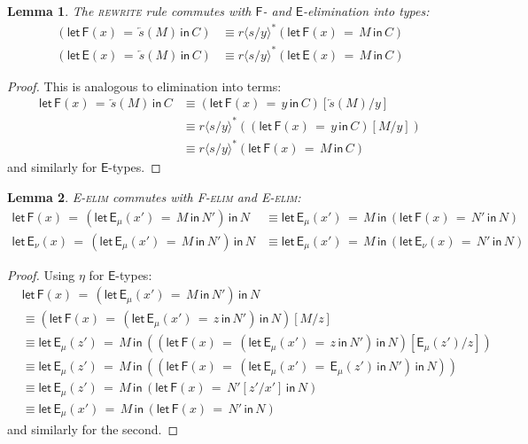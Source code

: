 \documentclass[10pt]{article}
\newtheorem{lemma}{Lemma}
\theoremstyle{definition}
\newcommand{\rewrite}[2]{\overleftarrow{#1}(#2)}
\newcommand\Fsym{\ensuremath{\mathsf{F}}}
\newcommand\Esym{\ensuremath{\mathsf{E}}}
\newcommand\St[2]{\ensuremath{{#1}^*(#2)}}
\newcommand\FE[3]{\ensuremath{\mathsf{let} \, \mathsf{F}(#2) \, = \, {#1} \, \mathsf{in} \, #3}}
\newcommand\EE[3]{\ensuremath{\mathsf{let} \, \mathsf{E}(#2) \, = \, {#1} \, \mathsf{in} \, #3}}
\newcommand\EEs[4]{\ensuremath{\mathsf{let} \, \mathsf{E}_{#1}(#3) \, = \, {#2} \, \mathsf{in} \, #4}}
\newcommand\EIs[2]{\ensuremath{\mathsf{E}_{#1}{(#2)}}}
\newcommand\ap[2]{\ensuremath{#1 \langle #2 \rangle }}
\begin{document}
\begin{lemma}
The \textsc{rewrite} rule commutes with \Fsym- and \Esym-elimination into types:
\begin{align*}
(\FE{\rewrite{s}{M}}{x}{C}) &\equiv \St{\ap{r}{s/y}}{\FE{M}{x}{C}} \\
(\EE{\rewrite{s}{M}}{x}{C}) &\equiv \St{\ap{r}{s/y}}{\EE{M}{x}{C}}
\end{align*}
\end{lemma}
\begin{proof}
This is analogous to elimination into terms:
\begin{align*}
\FE{\rewrite{s}{M}}{x}{C}
&\equiv (\FE{y}{x}{C})[\rewrite{s}{M}/y] \\
&\equiv \St{\ap{r}{s/y}}{(\FE{y}{x}{C})[M/y]} \\
&\equiv \St{\ap{r}{s/y}}{\FE{M}{x}{C}}
\end{align*}
and similarly for \Esym-types.
\end{proof}

\begin{lemma}\label{lem:s-elim-s-elim}
\textsc{E-elim} commutes with \textsc{F-elim} and \textsc{E-elim}:
\begin{align*}
\FE{(\EEs{\mu}{M}{x'}{N'})}{x}{N} &\equiv \EEs{\mu}{M}{x'}{(\FE{N'}{x}{N})} \\
\EEs{\nu}{(\EEs{\mu}{M}{x'}{N'})}{x}{N} &\equiv \EEs{\mu}{M}{x'}{(\EEs{\nu}{N'}{x}{N})}
\end{align*}
\end{lemma}
\begin{proof}
Using $\eta$ for \Esym-types:
\begin{align*}
&\FE{(\EEs{\mu}{M}{x'}{N'})}{x}{N} \\
&\equiv (\FE{(\EEs{\mu}{z}{x'}{N'})}{x}{N})[M/z] \\
&\equiv \EEs{\mu}{M}{z'}{((\FE{(\EEs{\mu}{z}{x'}{N'})}{x}{N})[\EIs{\mu}{z'}/z])} \\
&\equiv \EEs{\mu}{M}{z'}{((\FE{(\EEs{\mu}{\EIs{\mu}{z'}}{x'}{N'})}{x}{N}))} \\
&\equiv \EEs{\mu}{M}{z'}{(\FE{N'[z'/x']}{x}{N})} \\
&\equiv \EEs{\mu}{M}{x'}{(\FE{N'}{x}{N})}
\end{align*}
and similarly for the second.
\end{proof}
\end{document}
